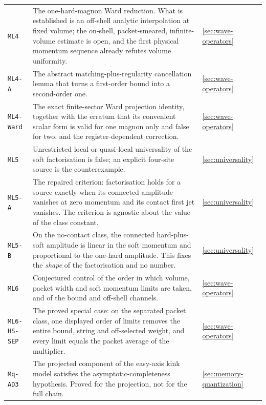 {\begin{longtable}{@{}p{}p{}p{}@{}}
\texttt{ML4} & The one-hard-magnon Ward reduction. What is established is an
off-shell analytic interpolation at fixed volume; the on-shell,
packet-smeared, infinite-volume estimate is open, and the first physical
momentum sequence already refutes volume uniformity. & \cref{sec:wave-operators}\\

\texttt{ML4-A} & The abstract matching-plus-regularity cancellation lemma that
turns a first-order bound into a second-order one. & \cref{sec:wave-operators}\\

\texttt{ML4-Ward} & The exact finite-sector Ward projection identity, together
with the erratum that its convenient scalar form is valid for one magnon only
and false for two, and the register-dependent correction. & \cref{sec:wave-operators}\\

\texttt{ML5} & Unrestricted local or quasi-local universality of the soft
factorisation is false; an explicit four-site source is the counterexample. & \cref{sec:universality}\\

\texttt{ML5-A} & The repaired criterion: factorisation holds for a source
exactly when its connected amplitude vanishes at zero momentum and its contact
first jet vanishes. The criterion is agnostic about the value of the class
constant. & \cref{sec:universality}\\

\texttt{ML5-B} & On the no-contact class, the connected hard-plus-soft
amplitude is linear in the soft momentum and proportional to the one-hard
amplitude. This fixes the \emph{shape} of the factorisation and no number. & \cref{sec:universality}\\

\texttt{ML6} & Conjectured control of the order in which volume, packet width
and soft momentum limits are taken, and of the bound and off-shell channels. & \cref{sec:wave-operators}\\

\texttt{ML6-HS-SEP} & The proved special case: on the separated packet class,
one displayed order of limits removes the entire bound, string and
off-selected weight, and every limit equals the packet average of the
multiplier. & \cref{sec:wave-operators}\\

\texttt{Mq-AD3} & The projected component of the easy-axis kink model
satisfies the asymptotic-completeness hypothesis. Proved for the projection,
not for the full chain. & \cref{sec:memory-quantization}\\


\end{longtable}}
